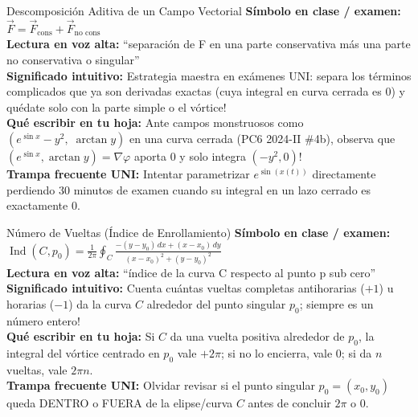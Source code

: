 \documentclass[11pt,a4paper]{article}
\begin{document}
\begin{definicionbox}{Descomposición Aditiva de un Campo Vectorial}
\textbf{Símbolo en clase / examen:} $\vec{F} = \vec{F}_{\text{cons}} + \vec{F}_{\text{no cons}}$\\[0.15cm]
\textbf{Lectura en voz alta:} ``separación de F en una parte conservativa más una parte no conservativa o singular''\\[0.12cm]
\textbf{Significado intuitivo:} Estrategia maestra en exámenes UNI: separa los términos complicados que ya son derivadas exactas (cuya integral en curva cerrada es $0$) y quédate solo con la parte simple o el vórtice!\\[0.12cm]
\textbf{Qué escribir en tu hoja:} Ante campos monstruosos como $(e^{\sin x} - y^2,\; \arctan y)$ en una curva cerrada (PC6 2024-II \#4b), observa que $(e^{\sin x}, \arctan y) = \nabla\varphi$ aporta $0$ y solo integra $(-y^2, 0)$!\\[0.12cm]
\textbf{Trampa frecuente UNI:} Intentar parametrizar $e^{\sin(x(t))}$ directamente perdiendo 30 minutos de examen cuando su integral en un lazo cerrado es exactamente $0$.
\end{definicionbox}

\begin{definicionbox}{Número de Vueltas (Índice de Enrollamiento)}
\textbf{Símbolo en clase / examen:} $\operatorname{Ind}(C, p_0) = \frac{1}{2\pi}\oint_C \frac{-(y-y_0)\,dx + (x-x_0)\,dy}{(x-x_0)^2 + (y-y_0)^2}$\\[0.15cm]
\textbf{Lectura en voz alta:} ``índice de la curva C respecto al punto p sub cero''\\[0.12cm]
\textbf{Significado intuitivo:} Cuenta cuántas vueltas completas antihorarias ($+1$) u horarias ($-1$) da la curva $C$ alrededor del punto singular $p_0$; siempre es un número entero!\\[0.12cm]
\textbf{Qué escribir en tu hoja:} Si $C$ da una vuelta positiva alrededor de $p_0$, la integral del vórtice centrado en $p_0$ vale $+2\pi$; si no lo encierra, vale $0$; si da $n$ vueltas, vale $2\pi n$.\\[0.12cm]
\textbf{Trampa frecuente UNI:} Olvidar revisar si el punto singular $p_0 = (x_0, y_0)$ queda DENTRO o FUERA de la elipse/curva $C$ antes de concluir $2\pi$ o $0$.
\end{definicionbox}
\end{document}
